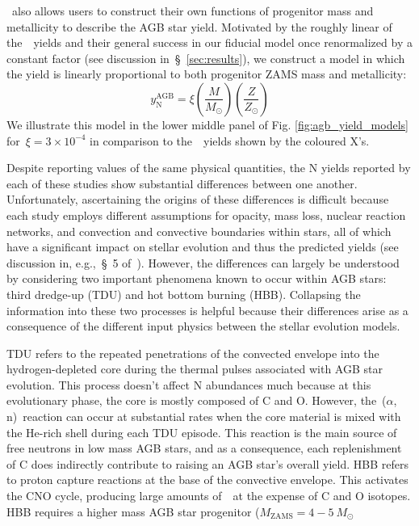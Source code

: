 \documentclass[ms.tex]{subfiles}
\begin{document}
\vice~also allows users to construct their own functions of progenitor mass
and metallicity to describe the AGB star yield.
Motivated by the roughly linear of the~\cristallo~yields and their general
success in our fiducial model once renormalized by a constant factor (see
discussion in~\S~\ref{sec:results}), we construct a model in which the yield
is linearly proportional to both progenitor ZAMS mass and metallicity:
\begin{equation}
y_\text{N}^\text{AGB} = \xi
\left(\frac{M}{M_\odot}\right)
\left(\frac{Z}{Z_\odot}\right)
\end{equation}
We illustrate this model in the lower middle panel of Fig.
\ref{fig:agb_yield_models} for~$\xi = 3\times10^{-4}$ in comparison to
the~\cristallo~yields shown by the coloured X's.
\par
Despite reporting values of the same physical quantities, the N yields
reported by each of these studies show substantial differences between one
another.
Unfortunately, ascertaining the origins of these differences is difficult
because each study employs different assumptions for opacity, mass loss,
nuclear reaction networks, and convection and convective boundaries within
stars, all of which have a significant impact on stellar evolution and thus
the predicted yields (see discussion in, e.g.,~\S~5 of~\citealp{Karakas2016}).
However, the differences can largely be understood by considering two important
phenomena known to occur within AGB stars: third dredge-up (TDU) and hot bottom
burning (HBB).
Collapsing the information into these two processes is helpful because their
differences arise as a consequence of the different input physics between the
stellar evolution models.
\par
TDU refers to the repeated penetrations of the convected envelope into the
hydrogen-depleted core during the thermal pulses associated with AGB star
evolution.
This process doesn't affect N abundances much because at this evolutionary
phase, the core is mostly composed of C and O.
However, the~\Cthirteen($\alpha$, n)\Osixteen~reaction can occur at substantial
rates when the core material is mixed with the He-rich shell during each TDU
episode.
This reaction is the main source of free neutrons in low mass AGB stars, and as
a consequence, each replenishment of C does indirectly contribute to raising
an AGB star's overall yield.
HBB refers to proton capture reactions at the base of the convective envelope.
This activates the CNO cycle, producing large amounts of~\Nfourteen~at the
expense of C and O isotopes.
HBB requires a higher mass AGB star progenitor ($M_\text{ZAMS} = 4 - 5~M_\odot$
\end{document}
